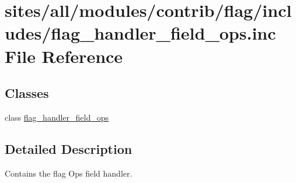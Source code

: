 \hypertarget{flag__handler__field__ops_8inc}{
\section{sites/all/modules/contrib/flag/includes/flag\_\-handler\_\-field\_\-ops.inc File Reference}
\label{flag__handler__field__ops_8inc}
}
\subsection*{Classes}
\begin{CompactItemize}
\item 
class \hyperlink{classflag__handler__field__ops}{flag\_\-handler\_\-field\_\-ops}
\end{CompactItemize}


\subsection{Detailed Description}
Contains the flag Ops field handler. 